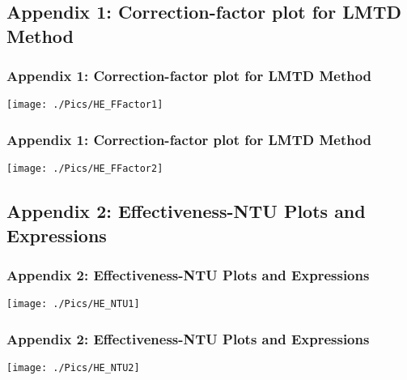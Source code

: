 \documentclass[10pt,compress,unknownkeysallowed]{beamer}
\begin{document}
\subsection{Appendix 1: Correction-factor plot for LMTD Method}\label{appendix1}

\begin{frame}
  \frametitle{Appendix 1: Correction-factor plot for LMTD Method}
    \begin{center}
         \texttt{[image: ./Pics/HE\_FFactor1]}
    \end{center}
\end{frame}

\begin{frame}
  \frametitle{Appendix 1: Correction-factor plot for LMTD Method}
    \begin{center}
         \texttt{[image: ./Pics/HE\_FFactor2]}
    \end{center}
\end{frame}

\subsection{Appendix 2: Effectiveness-NTU Plots and Expressions}\label{appendix2}
\begin{frame}
  \frametitle{Appendix 2: Effectiveness-NTU Plots and Expressions}
    \begin{center}
         \texttt{[image: ./Pics/HE\_NTU1]}
    \end{center}
\end{frame}
\begin{frame}
  \frametitle{Appendix 2: Effectiveness-NTU Plots and Expressions}
    \begin{center}
         \texttt{[image: ./Pics/HE\_NTU2]}
    \end{center}
\end{frame}


%  
\end{document}
